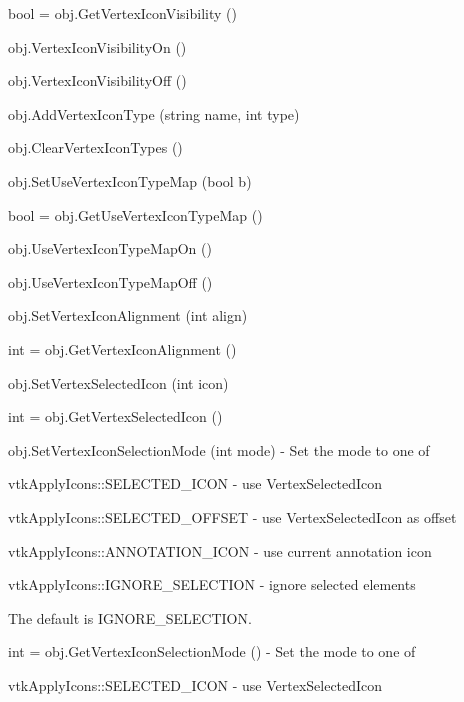 \begin{DoxyItemize}
\item {\ttfamily bool = obj.\-Get\-Vertex\-Icon\-Visibility ()}  
\item {\ttfamily obj.\-Vertex\-Icon\-Visibility\-On ()}  
\item {\ttfamily obj.\-Vertex\-Icon\-Visibility\-Off ()}  
\item {\ttfamily obj.\-Add\-Vertex\-Icon\-Type (string name, int type)}  
\item {\ttfamily obj.\-Clear\-Vertex\-Icon\-Types ()}  
\item {\ttfamily obj.\-Set\-Use\-Vertex\-Icon\-Type\-Map (bool b)}  
\item {\ttfamily bool = obj.\-Get\-Use\-Vertex\-Icon\-Type\-Map ()}  
\item {\ttfamily obj.\-Use\-Vertex\-Icon\-Type\-Map\-On ()}  
\item {\ttfamily obj.\-Use\-Vertex\-Icon\-Type\-Map\-Off ()}  
\item {\ttfamily obj.\-Set\-Vertex\-Icon\-Alignment (int align)}  
\item {\ttfamily int = obj.\-Get\-Vertex\-Icon\-Alignment ()}  
\item {\ttfamily obj.\-Set\-Vertex\-Selected\-Icon (int icon)}  
\item {\ttfamily int = obj.\-Get\-Vertex\-Selected\-Icon ()}  
\item {\ttfamily obj.\-Set\-Vertex\-Icon\-Selection\-Mode (int mode)} -\/ Set the mode to one of 
\begin{DoxyItemize}
\item vtk\-Apply\-Icons\-::\-S\-E\-L\-E\-C\-T\-E\-D\-\_\-\-I\-C\-O\-N -\/ use Vertex\-Selected\-Icon 
\item vtk\-Apply\-Icons\-::\-S\-E\-L\-E\-C\-T\-E\-D\-\_\-\-O\-F\-F\-S\-E\-T -\/ use Vertex\-Selected\-Icon as offset 
\item vtk\-Apply\-Icons\-::\-A\-N\-N\-O\-T\-A\-T\-I\-O\-N\-\_\-\-I\-C\-O\-N -\/ use current annotation icon 
\item vtk\-Apply\-Icons\-::\-I\-G\-N\-O\-R\-E\-\_\-\-S\-E\-L\-E\-C\-T\-I\-O\-N -\/ ignore selected elements 
\end{DoxyItemize}The default is I\-G\-N\-O\-R\-E\-\_\-\-S\-E\-L\-E\-C\-T\-I\-O\-N.  
\item {\ttfamily int = obj.\-Get\-Vertex\-Icon\-Selection\-Mode ()} -\/ Set the mode to one of 
\begin{DoxyItemize}
\item vtk\-Apply\-Icons\-::\-S\-E\-L\-E\-C\-T\-E\-D\-\_\-\-I\-C\-O\-N -\/ use Vertex\-Selected\-Icon 

\end{DoxyItemize}
\end{DoxyItemize}

